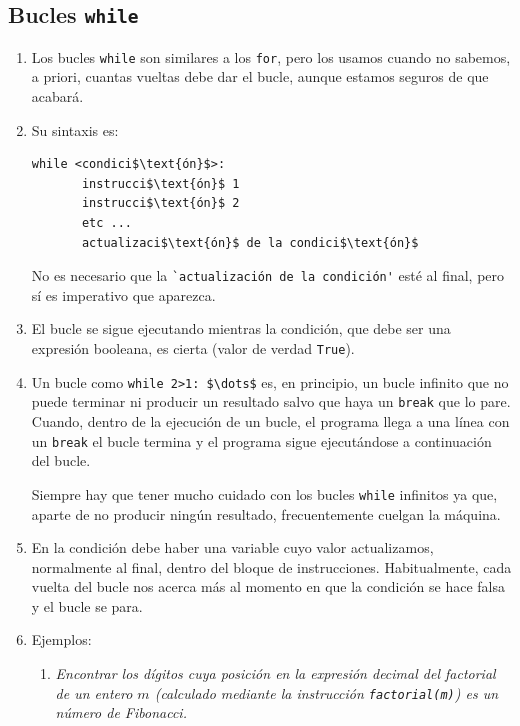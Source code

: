 \subsection{Bucles  \lstinline|while|}
\begin{enumerate}
\item Los bucles  \lstinline|while| son similares a los  \lstinline|for|, pero
los usamos
cuando no sabemos, a priori, cuantas vueltas debe dar el bucle, aunque estamos
seguros de que acabará. 

\item Su sintaxis es:
\begin{lstlisting}
while <condici$\text{ón}$>:
       instrucci$\text{ón}$ 1
       instrucci$\text{ón}$ 2
       etc ...
       actualizaci$\text{ón}$ de la condici$\text{ón}$
\end{lstlisting}

No es necesario que la \verb|`actualización de la condición'| esté al final,
pero sí es imperativo que aparezca. 

\item El bucle se sigue ejecutando mientras la condición, que debe ser una
expresión booleana,  es cierta (valor de verdad {\tt True}).
\item Un bucle como \lstinline|while 2>1: $\dots$| es, en principio,  un bucle
infinito
que no puede terminar ni producir un resultado salvo que haya un
\lstinline|break| que
lo pare.  Cuando, dentro de la ejecución de un bucle, el programa llega
a una línea con un \lstinline|break| el bucle termina y el programa sigue
ejecutándose a continuación del bucle. 

Siempre hay que tener mucho cuidado con los bucles \lstinline|while|
infinitos ya que, aparte de no producir ningún resultado, frecuentemente
cuelgan la máquina.

\item En la condición debe haber una variable cuyo valor actualizamos,
normalmente al final,  dentro del bloque de instrucciones. Habitualmente, cada
vuelta del bucle nos acerca más al momento en que la condición se hace falsa
y el bucle se para. 

\item {\sc Ejemplos:}

\begin{enumerate}
\item {\itshape Encontrar los dígitos  cuya posición en la expresión decimal del
factorial de un entero $m$ 
(calculado mediante la instrucción \lstinline|factorial(m)|) es un número de
Fibonacci.}


\end{enumerate}
\end{enumerate}
